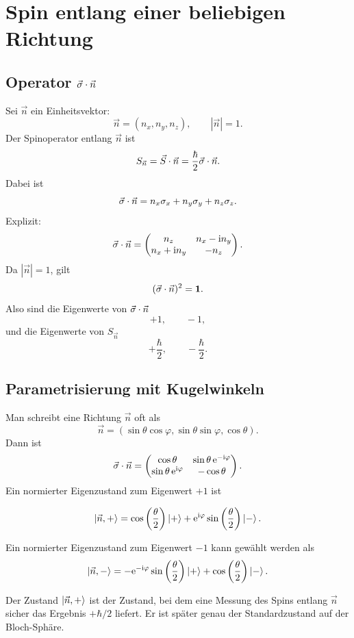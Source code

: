 \section{Spin entlang einer beliebigen Richtung}

\subsection{Operator \(\vec\sigma\cdot\vec n\)}

Sei \(\vec n\) ein Einheitsvektor:
\[
    \vec n=(n_x,n_y,n_z),
    \qquad |\vec n|=1.
\]
Der Spinoperator entlang \(\vec n\) ist
\[
    S_{\vec n}=\vec S\cdot\vec n
    =\frac{\hbar}{2}\vec\sigma\cdot\vec n.
\]
Dabei ist
\[
    \vec\sigma\cdot\vec n
    =n_x\sigma_x+n_y\sigma_y+n_z\sigma_z.
\]
Explizit:
\[
    \vec\sigma\cdot\vec n
    =
    \begin{pmatrix}
        n_z & n_x-\mathrm{i} n_y\\
        n_x+\mathrm{i} n_y & -n_z
    \end{pmatrix}.
\]
Da \(|\vec n|=1\), gilt
\[
    (\vec\sigma\cdot\vec n)^2=\mathbf{1}.
\]
Also sind die Eigenwerte von \(\vec\sigma\cdot\vec n\)
\[
    +1,
    \qquad
    -1,
\]
und die Eigenwerte von \(S_{\vec n}\)
\[
    +\frac{\hbar}{2},
    \qquad
    -\frac{\hbar}{2}.
\]

\subsection{Parametrisierung mit Kugelwinkeln}

Man schreibt eine Richtung \(\vec n\) oft als
\[
    \vec n=(\sin\theta\cos\varphi,\sin\theta\sin\varphi,\cos\theta).
\]
Dann ist
\[
    \vec\sigma\cdot\vec n
    =
    \begin{pmatrix}
        \cos\theta & \sin\theta\,\mathrm{e}^{-\mathrm{i}\varphi}\\
        \sin\theta\,\mathrm{e}^{\mathrm{i}\varphi} & -\cos\theta
    \end{pmatrix}.
\]
Ein normierter Eigenzustand zum Eigenwert \(+1\) ist
\begin{formulabox}
\[
    \left|\vec n,+\right\rangle
    =\cos\left(\frac{\theta}{2}\right)\left|+\right\rangle
    +\mathrm{e}^{\mathrm{i}\varphi}\sin\left(\frac{\theta}{2}\right)\left|-\right\rangle.
\]
\end{formulabox}
Ein normierter Eigenzustand zum Eigenwert \(-1\) kann gewählt werden als
\[
    \left|\vec n,-\right\rangle
    =-\mathrm{e}^{-\mathrm{i}\varphi}\sin\left(\frac{\theta}{2}\right)\left|+\right\rangle
    +\cos\left(\frac{\theta}{2}\right)\left|-\right\rangle.
\]

\begin{notebox}
Der Zustand \(\left|\vec n,+\right\rangle\) ist der Zustand, bei dem eine Messung des Spins entlang \(\vec n\) sicher das Ergebnis \(+\hbar/2\) liefert. Er ist später genau der Standardzustand auf der Bloch-Sphäre.
\end{notebox}

